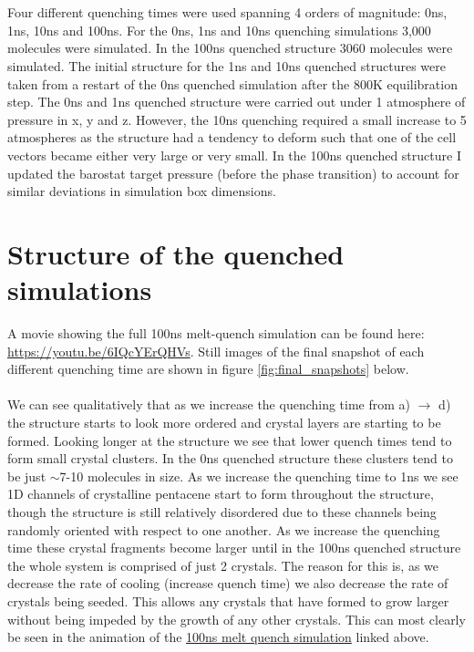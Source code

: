 \\\\
Four different quenching times were used spanning 4 orders of magnitude: 0ns, 1ns, 10ns and 100ns. For the 0ns, 1ns and 10ns quenching simulations 3,000 molecules were simulated. In the 100ns quenched structure 3060 molecules were simulated. The initial structure for the 1ns and 10ns quenched structures were taken from a restart of the 0ns quenched simulation after the 800K equilibration step. The 0ns and 1ns quenched structure were carried out under 1 atmosphere of pressure in x, y and z. However, the 10ns quenching required a small increase to 5 atmospheres as the structure had a tendency to deform such that one of the cell vectors became either very large or very small. In the 100ns quenched structure I updated the barostat target pressure (before the phase transition) to account for similar deviations in simulation box dimensions.
\section{Structure of the quenched simulations}
A movie showing the full 100ns melt-quench simulation can be found here: \href{https://youtu.be/6IQcYErQHVs}{https://youtu.be/6IQcYErQHVs}. Still images of the final snapshot of each different quenching time are shown in figure \ref{fig:final_snapshots} below.
\\\\
\noindent We can see qualitatively that as we increase the quenching time from a) $\rightarrow$ d) the structure starts to look more ordered and crystal layers are starting to be formed. Looking longer at the structure we see that lower quench times tend to form small crystal clusters. In the 0ns quenched structure these clusters tend to be just $\sim$7-10 molecules in size. As we increase the quenching time to 1ns we see 1D channels of crystalline pentacene start to form throughout the structure, though the structure is still relatively disordered due to these channels being randomly oriented with respect to one another. As we increase the quenching time these crystal fragments become larger until in the 100ns quenched structure the whole system is comprised of just 2 crystals. The reason for this is, as we decrease the rate of cooling (increase quench time) we also decrease the rate of crystals being seeded. This allows any crystals that have formed to grow larger without being impeded by the growth of any other crystals. This can most clearly be seen in the animation of the \href{https://youtu.be/6IQcYErQHVs}{100ns melt quench simulation} linked above.

